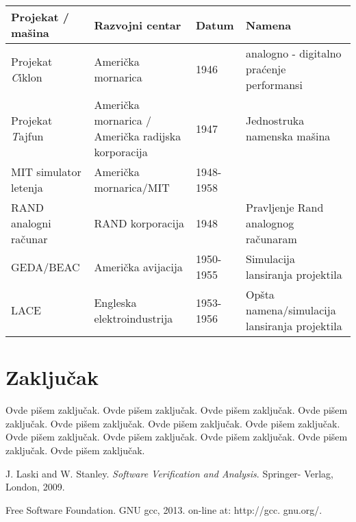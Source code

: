 \documentclass[a4paper]{article}
\begin{document}
{			\begin{table}[h!]
				\begin{center}
					\begin{tabular}{| p{2cm} | p{4cm} | p{1cm} | p{4cm} |}
						\hline
						Projekat / ma\v{s}ina & Razvojni centar & Datum & Namena \\
						\hline
						Projekat \emph Ciklon & Ameri\v{c}ka mornarica & 1946 & analogno - digitalno pra\'{c}enje performansi \\
						\hline
						Projekat \emph Tajfun & Ameri\v{c}ka mornarica / Ameri\v{c}ka radijska korporacija & 1947 & Jednostruka namenska ma\v{s}ina \\
						\hline
						MIT simulator letenja & Ameri\v{c}ka mornarica/MIT & 1948- 1958 & \\
						\hline
						RAND analogni ra\v{c}unar & RAND korporacija & 1948 & Pravljenje Rand analognog ra\v{c}unaram \\
						\hline
						GEDA/BEAC &  Ameri\v{c}ka avijacija & 1950- 1955 & Simulacija lansiranja projektila \\
						\hline
						LACE & Engleska elektroindustrija & 1953- 1956 & Op\v{s}ta namena/simulacija lansiranja projektila \\
						\hline
					\end{tabular}
					\label{tab:tableEAR}
				\end{center}
			\end{table}

\section{Zaključak}
\label{sec:zakljucak}

Ovde pišem zaključak. 
Ovde pišem zaključak. 
Ovde pišem zaključak. 
Ovde pišem zaključak. 
Ovde pišem zaključak. 
Ovde pišem zaključak. 
Ovde pišem zaključak. 
Ovde pišem zaključak. 
Ovde pišem zaključak. 
Ovde pišem zaključak. 
Ovde pišem zaključak. 
Ovde pišem zaključak. 


\appendix

\iffalse
 

\fi

\begin{thebibliography}{9}

 J. Laski and W. Stanley. \emph{Software Verification and Analysis}. Springer- Verlag, London, 2009.

 Free Software Foundation. GNU gcc, 2013. on-line at: http://gcc. gnu.org/.


\end{thebibliography}}
\end{document}
